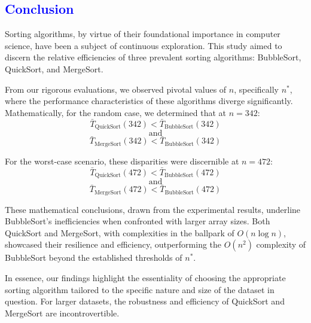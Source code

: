 \textcolor{blue}{\section{Conclusion}}

Sorting algorithms, by virtue of their foundational importance in computer science, have been a subject of continuous exploration. This study aimed to discern the relative efficiencies of three prevalent sorting algorithms: BubbleSort, QuickSort, and MergeSort.

From our rigorous evaluations, we observed pivotal values of \( n \), specifically \( n^* \), where the performance characteristics of these algorithms diverge significantly. Mathematically, for the random case, we determined that at \( n = 342 \):
\[ \bar{T}_{\text{QuickSort}}(342) < \bar{T}_{\text{BubbleSort}}(342) \]
\[ \text{and} \]
\[ \bar{T}_{\text{MergeSort}}(342) < \bar{T}_{\text{BubbleSort}}(342) \]

For the worst-case scenario, these disparities were discernible at \( n = 472 \):
\[ \bar{T}_{\text{QuickSort}}(472) < \bar{T}_{\text{BubbleSort}}(472) \]
\[ \text{and} \]
\[ \bar{T}_{\text{MergeSort}}(472) < \bar{T}_{\text{BubbleSort}}(472) \]

These mathematical conclusions, drawn from the experimental results, underline BubbleSort's inefficiencies when confronted with larger array sizes. Both QuickSort and MergeSort, with complexities in the ballpark of \(O(n \log n)\), showcased their resilience and efficiency, outperforming the \(O(n^2)\) complexity of BubbleSort beyond the established thresholds of \( n^* \).

In essence, our findings highlight the essentiality of choosing the appropriate sorting algorithm tailored to the specific nature and size of the dataset in question. For larger datasets, the robustness and efficiency of QuickSort and MergeSort are incontrovertible.
